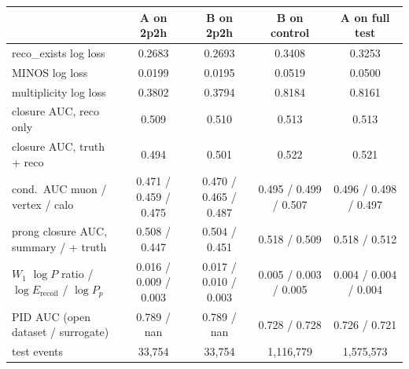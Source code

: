 \begin{tabular}{lcccc}
\toprule
 & A on 2p2h & B on 2p2h & B on control & A on full test \\
\midrule
reco\_exists log loss & 0.2683 & 0.2693 & 0.3408 & 0.3253 \\
MINOS log loss & 0.0199 & 0.0195 & 0.0519 & 0.0500 \\
multiplicity log loss & 0.3802 & 0.3794 & 0.8184 & 0.8161 \\
closure AUC, reco only & 0.509 & 0.510 & 0.513 & 0.513 \\
closure AUC, truth + reco & 0.494 & 0.501 & 0.522 & 0.521 \\
cond.\ AUC muon / vertex / calo & 0.471 / 0.459 / 0.475 & 0.470 / 0.465 / 0.487 & 0.495 / 0.499 / 0.507 & 0.496 / 0.498 / 0.497 \\
prong closure AUC, summary / + truth & 0.508 / 0.447 & 0.504 / 0.451 & 0.518 / 0.509 & 0.518 / 0.512 \\
$W_1$ $\log P$ ratio / $\log E_\mathrm{recoil}$ / $\log P_p$ & 0.016 / 0.009 / 0.003 & 0.017 / 0.010 / 0.003 & 0.005 / 0.003 / 0.005 & 0.004 / 0.004 / 0.004 \\
PID AUC (open dataset / surrogate) & 0.789 / nan & 0.789 / nan & 0.728 / 0.728 & 0.726 / 0.721 \\
test events & 33,754 & 33,754 & 1,116,779 & 1,575,573 \\
\bottomrule
\end{tabular}
